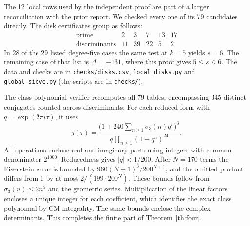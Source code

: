 The 12 local rows used by the independent proof are part of a larger reconciliation with the prior report. We checked every one of its 79 candidates directly. The disk certificates group as follows:
\[
\begin{array}{c|rrrrr}\text{prime}&2&3&7&13&17\\\hline
\text{discriminants}&11&39&22&5&2\end{array}
\]
In 28 of the 29 listed degree-five cases the same test at $k=5$ yields $s=6$. The remaining case of that list is $\Delta=-131$, where this proof gives $5\le s\le6$.
The data and checks are in \texttt{checks/disks.csv}, \texttt{local\_disks.py} and \texttt{global\_sieve.py} (the scripts are in \texttt{checks/}).

The class-polynomial verifier recomputes all 79 tables, encompassing 345 distinct conjugates counted across discriminants. For each reduced form with $q=\exp(2\pi i\tau)$, it uses
\[
 j(\tau)=\frac{\big(1+240\sum_{n\ge1}\sigma_3(n)q^n\big)^3}
                 {q\prod_{n\ge1}(1-q^n)^{24}}.
\]
All operations enclose real and imaginary parts using integers with common denominator $2^{1000}$. Reducedness gives $|q|<1/200$. After $N=170$ terms the Eisenstein error is bounded by $960(N+1)^3/200^{N+1}$, and the omitted product differs from 1 by at most $2/(199\cdot200^N)$. These bounds follow from $\sigma_3(n)\le2n^3$ and the geometric series. Multiplication of the linear factors encloses a unique integer for each coefficient, which identifies the exact class polynomial by CM integrality. The same bounds enclose the complex determinants. This completes the finite part of Theorem~\ref{th:four}.
